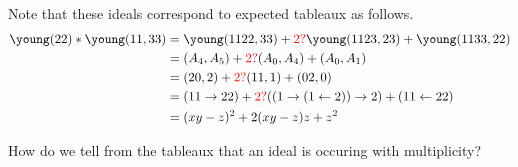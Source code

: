 \documentclass{article}
\begin{document}
\begin{example}
Note that these ideals correspond to expected tableaux as follows.
\begin{align}
\young(22) \ast \young(11,33) &= \young(1122,33) + {\color{red}2?}\young(1123,23) + \young(1133,22)  \\
  &= (A_4, A_5) + {\color{red}2?}(A_0,A_4) + (A_0, A_1) \\
  &= (20,2) + {\color{red}2?}(11,1) + (02,0) \\
  &= (11\to 22) + {\color{red}2?}((1\to (1\leftarrow 2))\to 2) + (11\leftarrow 22) \\ 
  &= (xy-z)^2 + 2(xy-z)z + z^2
\end{align} 
\begin{question}
    How do we tell from the tableaux that an ideal is occuring with multiplicity? 
\end{question}


\end{example}
\end{document}
